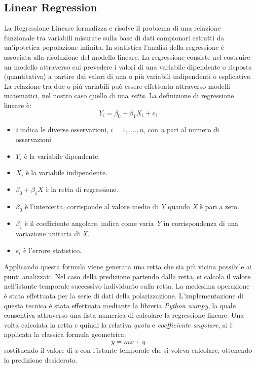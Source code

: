 \subsection{Linear Regression}
La Regressione Lineare formalizza e risolve il problema di una relazione funzionale tra variabili misurate sulla base di dati campionari estratti da un'ipotetica popolazione infinita. In statistica l'analisi della regressione è associata alla risoluzione del modello lineare.\cite{LinearReg}
La regressione consiste nel costruire un modello attraverso cui prevedere i valori di una variabile dipendente o risposta (quantitativa) a partire dai valori di una o più variabili indipendenti o esplicative.
La relazione tra due o più variabili può essere effettuata attraverso modelli matematici, nel nostro caso quello di una \textit{retta}.
La definizione di regressione lineare è:
\begin{equation}
Y_{i}= \beta_{0} + \beta_{1}X_{i} + e_{i}
\end{equation}
\begin{itemize}
\item \textit{i} indica le diverse osservazioni, $i= 1,....,n$, con \textit{n} pari al numero di osservazioni
\item $Y_{i}$ è la variabile dipendente.
\item $X_{i}$ è la variabile indipendente.
\item $\beta_{0} + \beta_{1}X$ è la retta di regressione. 
\item $\beta_{0}$ è l'intercetta, corrisponde al valore medio di \textit{Y} quando \textit{X} è pari a zero.
\item $\beta_{1}$ è il coefficiente angolare, indica come varia \textit{Y} in corrispondenza di una variazione unitaria di \textit{X}.
\item $e_{i}$ è l'errore statistico.

\end{itemize}
Applicando questa formula viene generata una retta che sia più vicina possibile ai punti analizzati. Nel caso della predizione partendo dalla retta, si calcola il valore nell'istante temporale successivo individuato sulla retta. La medesima operazione è stata effettuata per la serie di dati della polarizzazione.
L'implementazione di questa tecnica è stata effettuata mediante la libreria \textit{Python} \textit{numpy}, la quale consentiva attraverso una lista numerica di calcolare la regressione lineare.
Una volta calcolata la retta e quindi la relativa \textit{quota} e \textit{coefficiente angolare}, si è applicata la classica formula geometrica:
\begin{equation}
y=mx+q
\end{equation}
sostituendo il valore di \textit{x} con l'istante temporale che si voleva calcolare, ottenendo la predizione desiderata.
